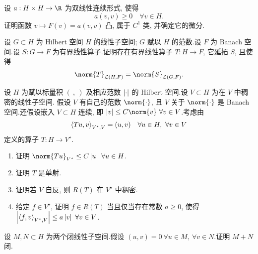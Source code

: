 \begin{exercise}
\label{exer:5.14}
设 $a:H\times H\to\R$ 为双线性连续形式, 使得
\begin{equation*}
a(v,v)\ge0\quad\forall v\in H.
\end{equation*}
证明函数 $v\mapsto F(v)=a(v,v)$ 凸, 属于 $C^1$ 类, 并确定它的微分.
\end{exercise}

\begin{exercise}
\label{exer:5.15}
设 $G\subset H$ 为 Hilbert 空间 $H$ 的线性子空间; $G$ 赋以 $H$ 的范数.设
$F$ 为 Banach 空间.设 $S:G\to F$ 为有界线性算子.证明存在有界线性算子
$T:H\to F$, 它延拓 $S$, 且使得
\begin{equation*}
\norm{T}_{\mathcal{L}(H,F)}=\norm{S}_{\mathcal{L}(G,F)}.
\end{equation*}
\end{exercise}

\begin{exercise}
\label{exer:5.16}
设 $H$ 为赋以标量积 $(\ ,\ )$ 及相应范数 $\left|\cdot\right|$ 的 Hilbert 空间.设
$V\subset H$ 为在 $V$ 中稠密的线性子空间.
假设 $V$ 有自己的范数
$\norm{\cdot}$, 且 $V$ 关于 $\norm{\cdot}$ 是 Banach 空间.还假设嵌入
$V\subset H$ 连续, 即 $\abs{v}\le C\norm{v}\ \forall v\in V$.考虑由
\begin{equation*}
\left\langle Tu,v\right\rangle_{V^\star,V}=(u,v)\quad\forall u\in H,\ \forall v\in V
\end{equation*}
定义的算子 $T:H\to V^\star$.
\begin{enumerate}[label=\arabic*., leftmargin=2.2em, itemsep=0.3em]
	\item 证明 $\norm{Tu}_{V^\star}\le C\abs{u}\ \forall u\in H$.
	\item 证明 $T$ 是单射.
	\item 证明若 $V$ 自反, 则 $R(T)$ 在 $V^\star$ 中稠密.
	\item 给定 $f\in V^\star$, 证明 $f\in R(T)$ 当且仅当存在常数 $a\ge0$,
	      使得 $\left|\left\langle f,v\right\rangle_{V^\star,V}\right|\le a\left|v\right|\ \forall v\in V$.
\end{enumerate}
\end{exercise}

\begin{exercise}
\label{exer:5.17}
设 $M,N\subset H$ 为两个闭线性子空间.假设
$(u,v)=0\ \forall u\in M,\ \forall v\in N$.证明 $M+N$ 闭.
\end{exercise}

